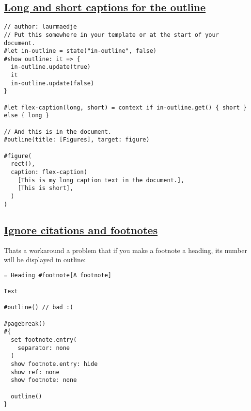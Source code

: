 \subsection{\texorpdfstring{\hyperref[long-and-short-captions-for-the-outline]{Long
and short captions for the
outline}}{Long and short captions for the outline}}\label{long-and-short-captions-for-the-outline}

\begin{verbatim}
// author: laurmaedje
// Put this somewhere in your template or at the start of your document.
#let in-outline = state("in-outline", false)
#show outline: it => {
  in-outline.update(true)
  it
  in-outline.update(false)
}

#let flex-caption(long, short) = context if in-outline.get() { short } else { long }

// And this is in the document.
#outline(title: [Figures], target: figure)

#figure(
  rect(),
  caption: flex-caption(
    [This is my long caption text in the document.],
    [This is short],
  )
)
\end{verbatim}

\pandocbounded{}

\subsection{\texorpdfstring{\hyperref[ignore-citations-and-footnotes]{Ignore
citations and
footnotes}}{Ignore citations and footnotes}}\label{ignore-citations-and-footnotes}

That\textquotesingle s a workaround a problem that if you make a
footnote a heading, its number will be displayed in outline:

\begin{verbatim}
= Heading #footnote[A footnote]

Text

#outline() // bad :(

#pagebreak()
#{
  set footnote.entry(
    separator: none
  )
  show footnote.entry: hide
  show ref: none
  show footnote: none

  outline()
}
\end{verbatim}

\pandocbounded{}

\pandocbounded{}


